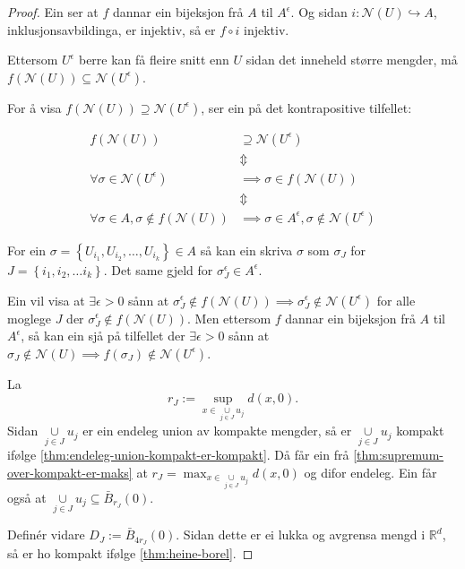 \documentclass[a4paper, 12pt, norsk]{article}
\theoremstyle{plain}
\theoremstyle{definition}
\newcommand{\Rb}{\mathbb{R}}
\newcommand{\Nc}{\mathcal{N}}
\newcommand{\union}{ \mathop{\cup}\limits }
\newcommand{\set}[1]{ \left\{ #1 \right\} } %
\begin{document}
\begin{proof}
	 Ein ser at \( f \) dannar ein bijeksjon frå \( A \) til \( A^\epsilon \). Og sidan \( i: \Nc(U) \hookrightarrow A \), inklusjonsavbildinga, er injektiv, så er \( f \circ i \) injektiv.

	Ettersom \( U^{\epsilon} \) berre kan få fleire snitt enn \( U \) sidan det inneheld større mengder, må \( f(\Nc(U)) \subseteq \Nc(U^{\epsilon}) \).
	
	For å visa \( f(\Nc(U)) \supseteq \Nc(U^{\epsilon}) \), ser ein på det kontrapositive tilfellet:
	 
	\begin{align*}
		f(\Nc(U)) &\supseteq \Nc(U^{\epsilon}) \\
		&\Updownarrow \\ 
		\forall \sigma \in \Nc(U^{\epsilon}) &\implies \sigma \in f(\Nc(U)) \\
		&\Updownarrow \\
		\forall \sigma \in A, \sigma \not\in f(\Nc(U)) &\implies \sigma \in A^\epsilon, \sigma \not\in \Nc(U^{\epsilon})
	\end{align*}

	For ein \( \sigma = \set{U_{i_1}, U_{i_2}, \dots, U_{i_k}} \in A \) så kan ein skriva \( \sigma \) som \( \sigma_J \) for \( J = \set{i_1, i_2, \dots i_k} \). Det same gjeld for \( \sigma^\epsilon_J \in A^\epsilon \). 
	
	Ein vil visa at \( \exists \epsilon > 0 \) sånn at \( \sigma^\epsilon_J \not\in f(\Nc(U)) \implies \sigma^\epsilon_J \not\in \Nc(U^{\epsilon}) \) for alle moglege \( J \) der \( \sigma^\epsilon_J \not\in f(\Nc(U)) \). Men ettersom \( f \) dannar ein bijeksjon frå \( A \) til \( A^\epsilon \), så kan ein sjå på tilfellet der \( \exists \epsilon > 0 \) sånn at \( \sigma_J \not\in \Nc(U) \implies f(\sigma_J) \not\in \Nc(U^{\epsilon}) \).

	La
	\[
		r_J := \sup_{x \in \union_{j \in J} u_j} d(x,0).
	\]
	Sidan \( \union_{j \in J} u_j \) er ein endeleg union av kompakte mengder, så er \( \union_{j \in J} u_j \) kompakt ifølge \autoref{thm:endeleg-union-kompakt-er-kompakt}. Då får ein frå \autoref{thm:supremum-over-kompakt-er-maks} at \( r_J = \max_{x \in \union_{j \in J} u_j} d(x,0) \) og difor endeleg. Ein får også at \( \union_{j \in J} u_j \subseteq \bar{B}_{r_J}(0) \).
	
	Definér vidare \( D_J := \bar{B}_{4r_J}(0) \). Sidan dette er ei lukka og avgrensa mengd i \( \Rb^d \), så er ho kompakt ifølge \autoref{thm:heine-borel}.


\end{proof}
\end{document}

